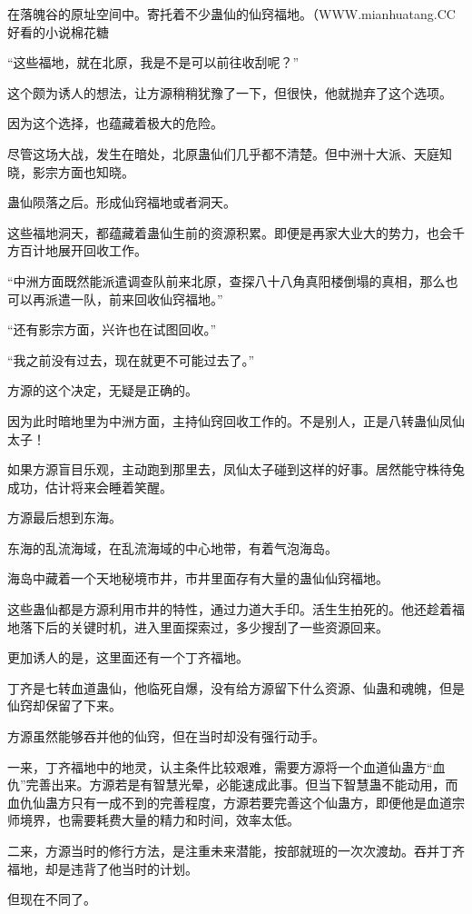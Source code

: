 \begin{this_body}
在落魄谷的原址空间中。寄托着不少蛊仙的仙窍福地。（WWW.mianhuatang.CC 好看的小说棉花糖

“这些福地，就在北原，我是不是可以前往收刮呢？”

这个颇为诱人的想法，让方源稍稍犹豫了一下，但很快，他就抛弃了这个选项。

因为这个选择，也蕴藏着极大的危险。

尽管这场大战，发生在暗处，北原蛊仙们几乎都不清楚。但中洲十大派、天庭知晓，影宗方面也知晓。

蛊仙陨落之后。形成仙窍福地或者洞天。

这些福地洞天，都蕴藏着蛊仙生前的资源积累。即便是再家大业大的势力，也会千方百计地展开回收工作。

“中洲方面既然能派遣调查队前来北原，查探八十八角真阳楼倒塌的真相，那么也可以再派遣一队，前来回收仙窍福地。”

“还有影宗方面，兴许也在试图回收。”

“我之前没有过去，现在就更不可能过去了。”

方源的这个决定，无疑是正确的。

因为此时暗地里为中洲方面，主持仙窍回收工作的。不是别人，正是八转蛊仙凤仙太子！

如果方源盲目乐观，主动跑到那里去，凤仙太子碰到这样的好事。居然能守株待兔成功，估计将来会睡着笑醒。

方源最后想到东海。

东海的乱流海域，在乱流海域的中心地带，有着气泡海岛。

海岛中藏着一个天地秘境市井，市井里面存有大量的蛊仙仙窍福地。

这些蛊仙都是方源利用市井的特性，通过力道大手印。活生生拍死的。他还趁着福地落下后的关键时机，进入里面探索过，多少搜刮了一些资源回来。

更加诱人的是，这里面还有一个丁齐福地。

丁齐是七转血道蛊仙，他临死自爆，没有给方源留下什么资源、仙蛊和魂魄，但是仙窍却保留了下来。

方源虽然能够吞并他的仙窍，但在当时却没有强行动手。

一来，丁齐福地中的地灵，认主条件比较艰难，需要方源将一个血道仙蛊方“血仇”完善出来。方源若是有智慧光晕，必能速成此事。但当下智慧蛊不能动用，而血仇仙蛊方只有一成不到的完善程度，方源若要完善这个仙蛊方，即便他是血道宗师境界，也需要耗费大量的精力和时间，效率太低。

二来，方源当时的修行方法，是注重未来潜能，按部就班的一次次渡劫。吞并丁齐福地，却是违背了他当时的计划。

但现在不同了。


\end{this_body}
